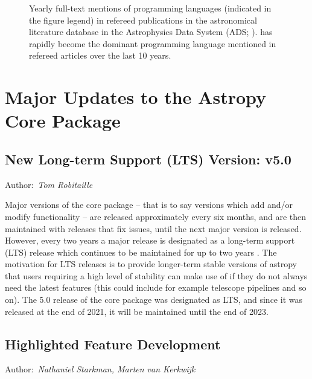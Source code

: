 \documentclass[modern]{aastex631}
\newcommand{\secauthor}[1]{{\color{blue}Author:~\textit{#1}}}
\begin{document}
\begin{figure}
    \begin{centering}
        \caption{
            Yearly full-text mentions of programming languages (indicated in the
            figure legend) in refereed publications in the astronomical
            literature database in the Astrophysics Data System (ADS;
            \citealt{ads}).
            \python has rapidly become the dominant programming language
            mentioned in refereed articles over the last 10 years.
        }
        \label{fig:python-mentions}
    \end{centering}
\end{figure}


\section{Major Updates to the Astropy Core Package} \label{sec:core-updates}

\subsection{New Long-term Support (LTS) Version: v5.0} \label{sec:core-v50}

\secauthor{Tom Robitaille}

Major versions of the core package -- that is to say versions which add and/or
modify functionality -- are released approximately every six months, and are
then maintained with releases that fix issues, until the next major version
is released. However, every two years a major release is designated as a
long-term support (LTS) release which continues to be maintained for up to two
years \citep{ape2}. The motivation for LTS releases is to provide longer-term stable
versions of astropy that users requiring a high level of stability can make
use of if they do not always need the latest features (this could include
for example telescope pipelines and so on). The 5.0 release of the core package was designated as LTS,
and since it was released at the end of 2021, it will be maintained until the
end of 2023.


\subsection{Highlighted Feature Development} \label{sec:core-features}

  \secauthor{Nathaniel Starkman, Marten van Kerkwijk}
\end{document}
